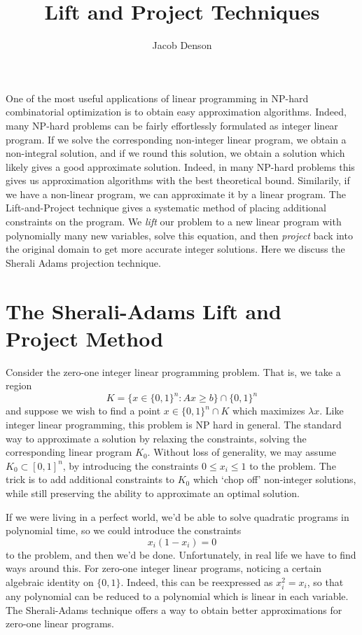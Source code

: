 \documentclass{article}
\title{Lift and Project Techniques}
\author{Jacob Denson}
\theoremstyle{plain}
\theoremstyle{definition}
\begin{document}
\maketitle

One of the most useful applications of linear programming in NP-hard combinatorial optimization is to obtain easy approximation algorithms. Indeed, many NP-hard problems can be fairly effortlessly formulated as integer linear program. If we solve the corresponding non-integer linear program, we obtain a non-integral solution, and if we round this solution, we obtain a solution which likely gives a good approximate solution. Indeed, in many NP-hard problems this gives us approximation algorithms with the best theoretical bound. Similarily, if we have a non-linear program, we can approximate it by a linear program. The Lift-and-Project technique gives a systematic method of placing additional constraints on the program. We {\it lift} our problem to a new linear program with polynomially many new variables, solve this equation, and then {\it project} back into the original domain to get more accurate integer solutions. Here we discuss the Sherali Adams projection technique.

\section{The Sherali-Adams Lift and Project Method}

Consider the zero-one integer linear programming problem. That is, we take a region
%
\[ K = \{ x \in \{ 0, 1 \}^n : Ax \geq b \} \cap \{ 0, 1 \}^n \]
%
and suppose we wish to find a point $x \in \{ 0, 1 \}^n \cap K$ which maximizes $\lambda x$. Like integer linear programming, this problem is NP hard in general. The standard way to approximate a solution by relaxing the constraints, solving the corresponding linear program $K_0$. Without loss of generality, we may assume $K_0 \subset [0,1]^n$, by introducing the constraints $0 \leq x_i \leq 1$ to the problem. The trick is to add additional constraints to $K_0$ which `chop off' non-integer solutions, while still preserving the ability to approximate an optimal solution.

If we were living in a perfect world, we'd be able to solve quadratic programs in polynomial time, so we could introduce the constraints
%
\[ x_i (1 - x_i) = 0 \]
%
to the problem, and then we'd be done. Unfortunately, in real life we have to find ways around this. For zero-one integer linear programs, noticing a certain algebraic identity on $\{ 0, 1 \}$. Indeed, this can be reexpressed as $x_i^2 = x_i$, so that any polynomial can be reduced to a polynomial which is linear in each variable. The Sherali-Adams technique offers a way to obtain better approximations for zero-one linear programs.
\end{document}
